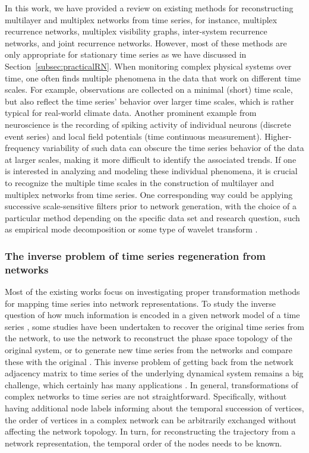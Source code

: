 In this work, we have provided a review on existing methods for reconstructing multilayer and multiplex networks from time series, for instance, multiplex recurrence networks, multiplex visibility graphs, inter-system recurrence networks, and joint recurrence networks. However, most of these methods are only appropriate for stationary time series as we have discussed in Section~\ref{subsec:practicalRN}. When monitoring complex physical systems over time, one often finds multiple phenomena in the data that work on different time scales. For example, observations are collected on a minimal (short) time scale, but also reflect the time series' behavior over larger time scales, which is rather typical for real-world climate data. Another prominent example from neuroscience is the recording of spiking activity of individual neurons (discrete event series) and local field potentials (time continuous measurement). Higher-frequency variability of such data can obscure the time series behavior of the data at larger scales, making it more difficult to identify the associated trends. If one is interested in analyzing and modeling these individual phenomena, it is crucial to recognize the multiple time scales in the construction of multilayer and multiplex networks from time series. One corresponding way could be applying successive scale-sensitive filters prior to network generation, with the choice of a particular method depending on the specific data set and research question, such as empirical mode decomposition \cite{gao2018} or some type of wavelet transform \cite{chen2012}.

\subsubsection{The inverse problem of time series regeneration from networks}

		Most of the existing works focus on investigating proper transformation methods for mapping time series into network representations. To study the inverse question of how much information is encoded in a given network model of a time series \cite{Wiedermann2017}, some studies have been undertaken to recover the original time series from the network, to use the network to reconstruct the phase space topology of the original system, or to generate new time series from the networks and compare these with the original \cite{Campanharo2011,hirata2008,Hirata2016,McCullough2017}. This inverse problem of getting back from the network adjacency matrix to time series of the underlying dynamical system remains a big challenge, which certainly has many applications \cite{Lancaster2018}. In general, transformations of complex networks to time series are not straightforward. Specifically, without having additional node labels informing about the temporal succession of vertices, the order of vertices in a complex network can be arbitrarily exchanged without affecting the network topology. In turn, for reconstructing the trajectory from a network representation, the temporal order of the nodes needs to be known.


